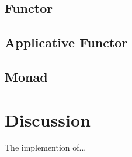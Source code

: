 \documentclass[12pt,fleqn]{article}
\begin{document}
\subsection{Functor}


\subsection{Applicative Functor}


\subsection{Monad}



\section{Discussion}

 The implemention of...
\end{document}
